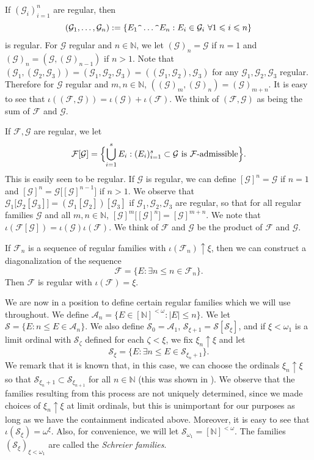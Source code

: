\documentclass[12pt]{amsart}
\theoremstyle{definition}
\newcommand{\fin}{[\mathbb{N}]^{<\omega}}
\newcommand{\nn}{\mathbb{N}}
\newcommand{\aaa}{\mathcal{A}}
\newcommand{\fff}{\mathcal{F}}
\newcommand{\gggg}{\mathcal{G}}
\newcommand{\sss}{\mathcal{S}}
\begin{document}
If $(\gggg_i)_{i=1}^n$ are regular, then $$(\gggg_1, \ldots, \gggg_n):=\{E_1\verb!^! \ldots \verb!^!E_n: E_i\in \gggg_i \text{\ }\forall 1\leqslant i\leqslant n\}$$ is regular.  For $\gggg$ regular and $n\in \nn$, we let $(\gggg)_n=\gggg$ if $n=1$ and $(\gggg)_n=(\gggg, (\gggg)_{n-1})$ if $n>1$.  Note that $(\gggg_1, (\gggg_2, \gggg_3))=(\gggg_1, \gggg_2, \gggg_3)=((\gggg_1, \gggg_2), \gggg_3)$ for any $\gggg_1, \gggg_2, \gggg_3$ regular. Therefore for $\gggg$ regular and $m,n\in \nn$, $((\gggg)_m, (\gggg)_n)=(\gggg)_{m+n}$. It is easy to see that $\iota((\fff, \gggg))=\iota(\gggg)+\iota(\fff)$.  We think of $(\fff, \gggg)$ as being the sum of $\fff$ and $\gggg$.  

If $\fff, \gggg$ are regular, we let $$\fff[\gggg]=\Bigl\{\bigcup_{i=1}^s E_i: (E_i)_{i=1}^s\subset \gggg \text{\ is\ }\fff\text{-admissible}\Bigr\}.$$ This is easily seen to be regular.  If $\gggg$ is regular, we can define $[\gggg]^n=\gggg$ if $n=1$ and $[\gggg]^n=\gggg\bigl[[\gggg]^{n-1}\bigr]$ if $n>1$. We observe that $\gggg_1\bigl[\gggg_2[\gggg_3]\bigr]=(\gggg_1[\gggg_2])[\gggg_3]$ if $\gggg_1, \gggg_2, \gggg_3$ are regular, so that for all regular families $\gggg$ and all $m,n\in \nn$, $[\gggg]^m\bigl[[\gggg]^n\bigr] = [\gggg]^{m+n}$.  We note that $\iota(\fff[\gggg])=\iota(\gggg)\iota(\fff)$.  We think of $\fff$ and $\gggg$ be the product of $\fff$ and $\gggg$.  

If $\fff_n$ is a sequence of regular families with $\iota(\fff_n)\uparrow \xi$, then we can construct a diagonalization of the sequence $$\fff=\{E: \exists n\leqslant n\in \fff_n\}.$$  Then $\fff$ is regular with $\iota(\fff)=\xi$.  



We are now in a position to define certain regular families which we will use throughout.  We define $\aaa_n=\{E\in \fin: |E|\leqslant n\}$.  We let $\sss=\{E: n\leqslant E\in \aaa_n\}$.  We also define $\sss_0=\aaa_1$, $\sss_{\xi+1}=\sss[\sss_\xi]$, and if $\xi<\omega_1$ is a limit ordinal with $\sss_\zeta$ defined for each $\zeta<\xi$, we fix $\xi_n\uparrow \xi$ and let $$\sss_\xi=\{E: \exists n\leqslant E\in \sss_{\xi_n+1}\}.$$  We remark that it is known that, in this case, we can choose the ordinals $\xi_n\uparrow \xi$ so that $\sss_{\xi_n+1}\subset \sss_{\xi_{n+1}}$ for all $n\in \nn$ (this was shown in \cite{Causey}).  We observe that the families resulting from this process are not uniquely determined, since we made choices of $\xi_n\uparrow \xi$ at limit ordinals, but this is unimportant for our purposes as long as we have the containment indicated above.  Moreover, it is easy to see that $\iota(\sss_\xi)=\omega^\xi$.  Also, for convenience, we will let $\sss_{\omega_1}=\fin$.  The families $(\sss_\xi)_{\xi<\omega_1}$ are called the \emph{Schreier families}.  
\end{document}
